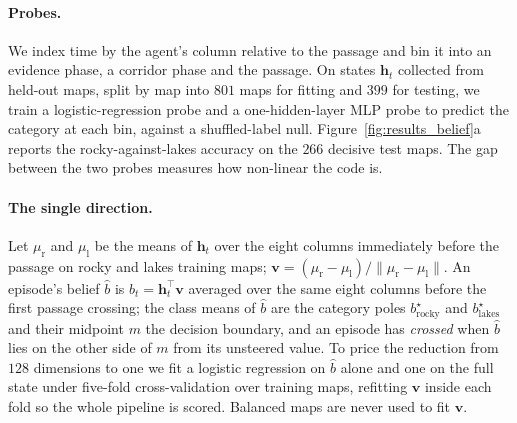 \paragraph{Probes.}
We index time by the agent's column relative to the passage and bin it into an
evidence phase, a corridor phase and the passage. On states $\mathbf{h}_t$
collected from held-out maps, split by map into $801$ maps for fitting and
$399$ for testing, we train a logistic-regression probe and a one-hidden-layer
MLP probe to predict the category at each bin, against a shuffled-label null.
Figure~\ref{fig:results_belief}a reports the rocky-against-lakes accuracy on
the $266$ decisive test maps. The gap between the two probes measures how
non-linear the code is.

\paragraph{The single direction.}
Let $\mu_{\mathrm r}$ and $\mu_{\mathrm l}$ be the means of $\mathbf{h}_t$ over
the eight columns immediately before the passage on rocky and lakes training
maps; $\mathbf{v}=(\mu_{\mathrm r}-\mu_{\mathrm l})/\lVert\mu_{\mathrm r}-\mu_{\mathrm l}\rVert$.
An episode's belief $\hat b$ is $b_t=\mathbf{h}_t^{\top}\mathbf{v}$ averaged
over the same eight columns before the first passage crossing; the class means
of $\hat b$ are the category poles $b^{\star}_{\text{rocky}}$ and $b^{\star}_{\text{lakes}}$
and their midpoint $m$ the decision boundary, and an
episode has \emph{crossed} when $\hat b$ lies on the other side of $m$ from its
unsteered value. To price the reduction from $128$ dimensions to one we fit a
logistic regression on $\hat b$ alone and one on the full state under
five-fold cross-validation over training maps, refitting $\mathbf{v}$ inside
each fold so the whole pipeline is scored. Balanced maps are never used to fit
$\mathbf{v}$.

